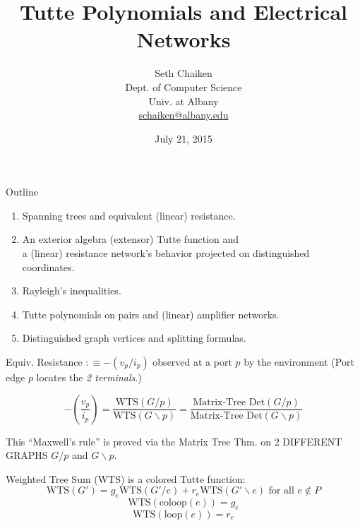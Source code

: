 \documentclass{beamer}
\title{Tutte Polynomials and Electrical Networks}
\author{Seth Chaiken\\
Dept. of Computer Science\\
Univ. at Albany\\
\url{schaiken@albany.edu}
}
\date{July 21, 2015}
\begin{document}
\begin{frame}
 \titlepage
\end{frame}



\begin{frame}{Outline}
\begin{enumerate}
\item Spanning trees and equivalent (linear) resistance.
\item An exterior algebra (extensor) Tutte function and\\
 a (linear) resistance network's
behavior projected on distinguished coordinates.
\item Rayleigh's inequalities.
\item Tutte polynomials on pairs and (linear) amplifier networks.
\item Distinguished graph vertices and splitting formulas.
\end{enumerate}
\end{frame}


\begin{frame}{Equiv. Resistance $ :\equiv -(v_p/i_p)$
observed at a port $p$ by the environment
(Port edge $p$ locates the \textit{2 terminals}.)}

\begin{theorem}
\[
-(\frac{v_p}{i_p})=\frac{\mbox{WTS}(G/p)}
{\mbox{WTS}(G\backslash p)} 
= \frac{\mbox{Matrix-Tree Det}(G/p)}
       {\mbox{Matrix-Tree Det}(G\backslash p)}
\]
\end{theorem}

This 
``Maxwell's rule'' is proved via the Matrix Tree Thm. on 2 DIFFERENT GRAPHS
$G/p$ and $G\backslash p$.

\begin{theorem}
Weighted Tree Sum (WTS) is a colored Tutte function:
\[
\mbox{WTS}(G') =
g_e \mbox{WTS}(G'/e) + r_e \mbox{WTS} (G' \backslash e)
\text{\ for all\ }e \not\in P
\]
\[
\mbox{WTS}(\text{coloop}(e)) = g_e
\]
\[
\mbox{WTS}(\text{loop}(e)) = r_e
\]
\end{theorem}
\end{frame}
\end{document}
